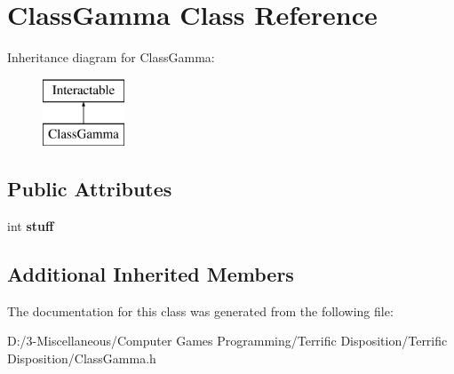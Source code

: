 \hypertarget{class_class_gamma}{}\section{Class\+Gamma Class Reference}
\label{class_class_gamma}
Inheritance diagram for Class\+Gamma\+:\begin{figure}[H]
\begin{center}
\leavevmode
\includegraphics[height=2.000000cm]{class_class_gamma}
\end{center}
\end{figure}
\subsection*{Public Attributes}
\begin{DoxyCompactItemize}
\item 
\mbox{\label{class_class_gamma_af238acc410b2b007d36d2045c60bd610}} 
int {\bfseries stuff}
\end{DoxyCompactItemize}
\subsection*{Additional Inherited Members}


The documentation for this class was generated from the following file\+:\begin{DoxyCompactItemize}
\item 
D\+:/3-\/\+Miscellaneous/\+Computer Games Programming/\+Terrific Disposition/\+Terrific Disposition/Class\+Gamma.\+h\end{DoxyCompactItemize}
